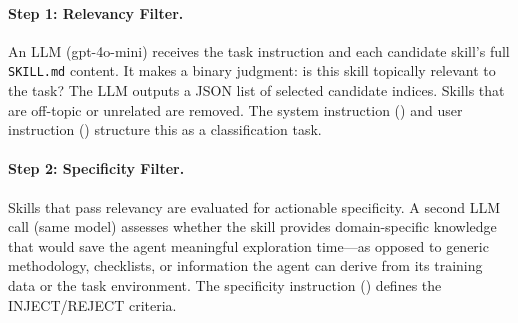 \documentclass[11pt]{article}
\begin{document}
\paragraph{Step 1: Relevancy Filter.}
An LLM (gpt-4o-mini) receives the task instruction and each candidate skill's full \texttt{SKILL.md} content.
It makes a binary judgment: is this skill topically relevant to the task?
The LLM outputs a JSON list of selected candidate indices.
Skills that are off-topic or unrelated are removed.
The system instruction () and user instruction () structure this as a classification task.

\paragraph{Step 2: Specificity Filter.}
Skills that pass relevancy are evaluated for actionable specificity.
A second LLM call (same model) assesses whether the skill provides domain-specific knowledge that would save the agent meaningful exploration time---as opposed to generic methodology, checklists, or information the agent can derive from its training data or the task environment.
The specificity instruction () defines the INJECT/REJECT criteria.
\end{document}
